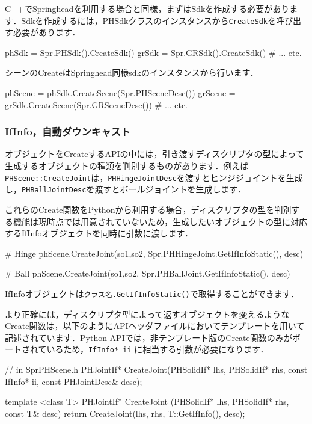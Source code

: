 C++でSpringheadを利用する場合と同様，まずはSdkを作成する必要があります．Sdkを作成するには，PHSdkクラスのインスタンスから\texttt{CreateSdk}を呼び出す必要があります．
\begin{sourcecode}
phSdk = Spr.PHSdk().CreateSdk()
grSdk = Spr.GRSdk().CreateSdk()
# ... etc.
\end{sourcecode}
\KLUDGE %

\KLUDGE シーンのCreateはSpringhead同様sdkのインスタンスから行います．
\begin{sourcecode}
phScene = phSdk.CreateScene(Spr.PHSceneDesc())
grScene = grSdk.CreateScene(Spr.GRSceneDesc())
# ... etc.
\end{sourcecode}

\KLUDGE %
\KLUDGE %
\subsubsection*{IfInfo，自動ダウンキャスト}

\KLUDGE オブジェクトをCreateするAPIの中には，引き渡すディスクリプタの型によって生成するオブジェクトの種類を判別するものがあります．例えば\texttt{PHScene::CreateJoint}は，\texttt{PHHingeJointDesc}を渡すとヒンジジョイントを生成し，\texttt{PHBallJointDesc}を渡すとボールジョイントを生成します．

\KLUDGE これらのCreate関数をPythonから利用する場合，ディスクリプタの型を判別する機能は現時点では用意されていないため，生成したいオブジェクトの型に対応するIfInfoオブジェクトを同時に引数に渡します．
\begin{sourcecode}
# Hinge
phScene.CreateJoint(so1,so2, Spr.PHHingeJoint.GetIfInfoStatic(), desc)

# Ball
phScene.CreateJoint(so1,so2, Spr.PHBallJoint.GetIfInfoStatic(),  desc)
\end{sourcecode} 
IfInfoオブジェクトは\texttt{クラス名.GetIfInfoStatic()}で取得することができます．

\KLUDGE より正確には，ディスクリプタ型によって返すオブジェクトを変えるようなCreate関数は，以下のようにAPIヘッダファイルにおいてテンプレートを用いて記述されています．Python APIでは，非テンプレート版のCreate関数のみがポートされているため，\texttt{IfInfo* ii} に相当する引数が必要になります．
\begin{sourcecode}
// in SprPHScene.h
PHJointIf* CreateJoint(PHSolidIf* lhs, PHSolidIf* rhs,
  const IfInfo* ii, const PHJointDesc& desc);

template <class T> PHJointIf* CreateJoint
(PHSolidIf* lhs, PHSolidIf* rhs, const T& desc){
  return CreateJoint(lhs, rhs, T::GetIfInfo(), desc);
}
\end{sourcecode}

